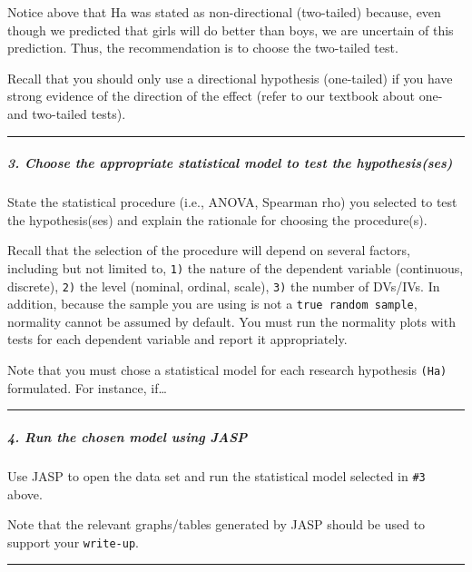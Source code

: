 \documentclass[11pt,]{article}
\begin{document}
Notice above that Ha was stated as non-directional (two-tailed) because,
even though we predicted that girls will do better than boys, we are
uncertain of this prediction. Thus, the recommendation is to choose the
two-tailed test.

Recall that you should only use a directional hypothesis (one-tailed) if
you have strong evidence of the direction of the effect (refer to our
textbook about one- and two-tailed tests).

\begin{center}\rule{0.5\linewidth}{0.5pt}\end{center}

\hypertarget{choose-the-appropriate-statistical-model-to-test-the-hypothesisses}{%
\subparagraph{3. Choose the appropriate statistical model to test the
hypothesis(ses)}\label{choose-the-appropriate-statistical-model-to-test-the-hypothesisses}}

State the statistical procedure (i.e., ANOVA, Spearman rho) you selected
to test the hypothesis(ses) and explain the rationale for choosing the
procedure(s).

Recall that the selection of the procedure will depend on several
factors, including but not limited to, \texttt{1)} the nature of the
dependent variable (continuous, discrete), \texttt{2)} the level
(nominal, ordinal, scale), \texttt{3)} the number of DVs/IVs. In
addition, because the sample you are using is not a
\texttt{true\ random\ sample}, normality cannot be assumed by default.
You must run the normality plots with tests for each dependent variable
and report it appropriately.

Note that you must chose a statistical model for each research
hypothesis \texttt{(Ha)} formulated. For instance, if\ldots{}

\begin{center}\rule{0.5\linewidth}{0.5pt}\end{center}

\hypertarget{run-the-chosen-model-using-jasp}{%
\subparagraph{4. Run the chosen model using
JASP}\label{run-the-chosen-model-using-jasp}}

Use JASP to open the data set and run the statistical model selected in
\texttt{\#3} above.

Note that the relevant graphs/tables generated by JASP should be used to
support your \texttt{write-up}.

\begin{center}\rule{0.5\linewidth}{0.5pt}\end{center}
\end{document}
